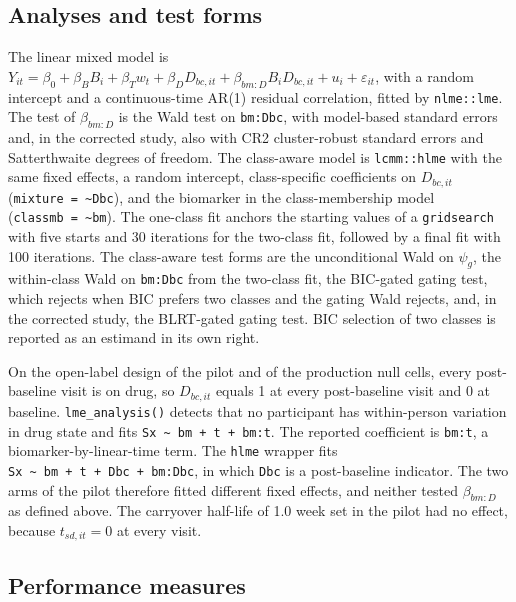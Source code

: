 \documentclass[
  11pt,
]{article}
\begin{document}
\subsection{Analyses and test forms}\label{analyses-and-test-forms}

The linear mixed model is \(Y_{it} = \beta_0 + \beta_B B_i +
\beta_T w_t + \beta_D D_{bc,it} + \beta_{bm:D} B_i D_{bc,it} +
u_i + \varepsilon_{it}\), with a random intercept and a
continuous-time AR(1) residual correlation, fitted by \texttt{nlme::lme}.
The test of \(\beta_{bm:D}\) is the Wald test on \texttt{bm:Dbc}, with
model-based standard errors and, in the corrected study, also with
CR2 cluster-robust standard errors and Satterthwaite degrees of
freedom. The class-aware model is \texttt{lcmm::hlme} with the same fixed
effects, a random intercept, class-specific coefficients on
\(D_{bc,it}\) (\texttt{mixture\ =\ \textasciitilde{}Dbc}), and the biomarker in the
class-membership model (\texttt{classmb\ =\ \textasciitilde{}bm}). The one-class fit anchors
the starting values of a \texttt{gridsearch} with five starts and 30
iterations for the two-class fit, followed by a final fit with 100
iterations. The class-aware test forms are the unconditional Wald on
\(\psi_g\), the within-class Wald on \texttt{bm:Dbc} from the two-class fit,
the BIC-gated gating test, which rejects when BIC prefers two classes
and the gating Wald rejects, and, in the corrected study, the
BLRT-gated gating test. BIC selection of two classes is reported as
an estimand in its own right.

On the open-label design of the pilot and of the production null
cells, every post-baseline visit is on drug, so \(D_{bc,it}\) equals 1
at every post-baseline visit and 0 at baseline. \texttt{lme\_analysis()}
detects that no participant has within-person variation in drug
state and fits \texttt{Sx\ \textasciitilde{}\ bm\ +\ t\ +\ bm:t}. The reported coefficient is
\texttt{bm:t}, a biomarker-by-linear-time term. The \texttt{hlme} wrapper fits
\texttt{Sx\ \textasciitilde{}\ bm\ +\ t\ +\ Dbc\ +\ bm:Dbc}, in which \texttt{Dbc} is a post-baseline
indicator. The two arms of the pilot therefore fitted different fixed
effects, and neither tested \(\beta_{bm:D}\) as defined above. The
carryover half-life of 1.0 week set in the pilot had no effect,
because \(t_{sd,it} = 0\) at every visit.

\subsection{Performance measures}\label{performance-measures}
\end{document}
